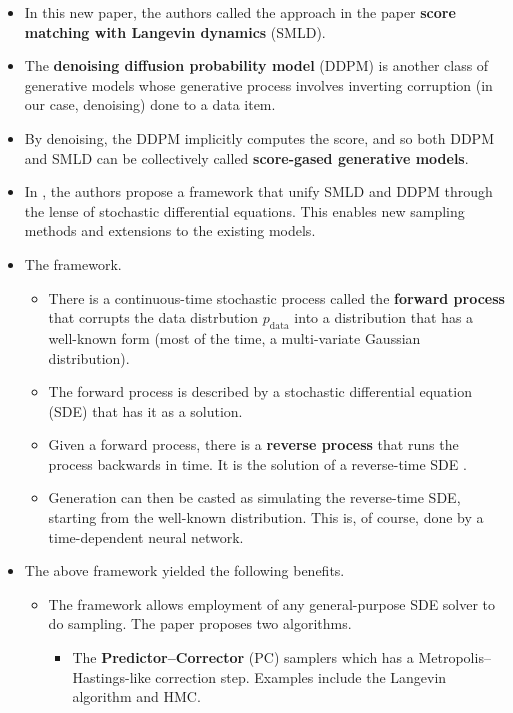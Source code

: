 \documentclass[10pt]{article}
\newcommand{\mrm}[1]{\mathrm{#1}}
\begin{document}
\begin{itemize}
  \item In this new paper, the authors called the approach in the \cite{Song:2019} paper {\bf score matching with Langevin dynamics} (SMLD).

  \item The {\bf denoising diffusion probability model} (DDPM) \cite{SohlDickstein:2015,Ho:2020} is another class of generative models whose generative process involves inverting corruption (in our case, denoising) done to a data item.
  
  \item By denoising, the DDPM implicitly computes the score, and so both DDPM and SMLD can be collectively called {\bf score-gased generative models}.
  
  \item In \cite{Song:2021}, the authors propose a framework that unify SMLD and DDPM through the lense of stochastic differential equations. This enables new sampling methods and extensions to the existing models.
  
  \item The framework.
  \begin{itemize}
    \item There is a continuous-time stochastic process called the {\bf forward process} that corrupts the data distrbution $p_{\mrm{data}}$ into a distribution that has a well-known form (most of the time, a multi-variate Gaussian distribution).
    
    \item The forward process is described by a stochastic differential equation (SDE) that has it as a solution.
    
    \item Given a forward process, there is a {\bf reverse process} that runs the process backwards in time. It is the solution of a reverse-time SDE \cite{Anderson:1982}.
    
    \item Generation can then be casted as simulating the reverse-time SDE, starting from the well-known distribution. This is, of course, done by a time-dependent neural network.
  \end{itemize}

  \item The above framework yielded the following benefits.
  \begin{itemize}
    \item The framework allows employment of any general-purpose SDE solver to do sampling. The paper proposes two algorithms.
    \begin{itemize}
      \item The {\bf Predictor--Corrector} (PC) samplers which has a Metropolis--Hastings-like correction step. Examples include the Langevin algorithm and HMC.
      

\end{itemize}
\end{itemize}
\end{itemize}
\end{document}
